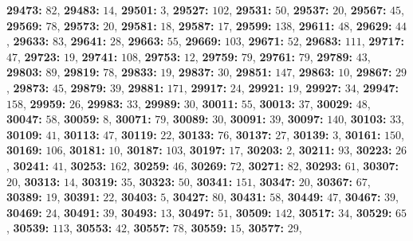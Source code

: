 \textsf{\bfseries 29473:} $82$, \textsf{\bfseries 29483:} $14$, \textsf{\bfseries 29501:} $3$, \textsf{\bfseries 29527:} $102$, \textsf{\bfseries 29531:} $50$, \textsf{\bfseries 29537:} $20$, \textsf{\bfseries 29567:} $45$, \textsf{\bfseries 29569:} $78$, \textsf{\bfseries 29573:} $20$, \textsf{\bfseries 29581:} $18$, \textsf{\bfseries 29587:} $17$, \textsf{\bfseries 29599:} $138$, \textsf{\bfseries 29611:} $48$, \textsf{\bfseries 29629:} $44$, \textsf{\bfseries 29633:} $83$, \textsf{\bfseries 29641:} $28$, \textsf{\bfseries 29663:} $55$, \textsf{\bfseries 29669:} $103$, \textsf{\bfseries 29671:} $52$, \textsf{\bfseries 29683:} $111$, \textsf{\bfseries 29717:} $47$, \textsf{\bfseries 29723:} $19$, \textsf{\bfseries 29741:} $108$, \textsf{\bfseries 29753:} $12$, \textsf{\bfseries 29759:} $79$, \textsf{\bfseries 29761:} $79$, \textsf{\bfseries 29789:} $43$, \textsf{\bfseries 29803:} $89$, \textsf{\bfseries 29819:} $78$, \textsf{\bfseries 29833:} $19$, \textsf{\bfseries 29837:} $30$, \textsf{\bfseries 29851:} $147$, \textsf{\bfseries 29863:} $10$, \textsf{\bfseries 29867:} $29$, \textsf{\bfseries 29873:} $45$, \textsf{\bfseries 29879:} $39$, \textsf{\bfseries 29881:} $171$, \textsf{\bfseries 29917:} $24$, \textsf{\bfseries 29921:} $19$, \textsf{\bfseries 29927:} $34$, \textsf{\bfseries 29947:} $158$, \textsf{\bfseries 29959:} $26$, \textsf{\bfseries 29983:} $33$, \textsf{\bfseries 29989:} $30$, \textsf{\bfseries 30011:} $55$, \textsf{\bfseries 30013:} $37$, \textsf{\bfseries 30029:} $48$, \textsf{\bfseries 30047:} $58$, \textsf{\bfseries 30059:} $8$, \textsf{\bfseries 30071:} $79$, \textsf{\bfseries 30089:} $30$, \textsf{\bfseries 30091:} $39$, \textsf{\bfseries 30097:} $140$, \textsf{\bfseries 30103:} $33$, \textsf{\bfseries 30109:} $41$, \textsf{\bfseries 30113:} $47$, \textsf{\bfseries 30119:} $22$, \textsf{\bfseries 30133:} $76$, \textsf{\bfseries 30137:} $27$, \textsf{\bfseries 30139:} $3$, \textsf{\bfseries 30161:} $150$, \textsf{\bfseries 30169:} $106$, \textsf{\bfseries 30181:} $10$, \textsf{\bfseries 30187:} $103$, \textsf{\bfseries 30197:} $17$, \textsf{\bfseries 30203:} $2$, \textsf{\bfseries 30211:} $93$, \textsf{\bfseries 30223:} $26$, \textsf{\bfseries 30241:} $41$, \textsf{\bfseries 30253:} $162$, \textsf{\bfseries 30259:} $46$, \textsf{\bfseries 30269:} $72$, \textsf{\bfseries 30271:} $82$, \textsf{\bfseries 30293:} $61$, \textsf{\bfseries 30307:} $20$, \textsf{\bfseries 30313:} $14$, \textsf{\bfseries 30319:} $35$, \textsf{\bfseries 30323:} $50$, \textsf{\bfseries 30341:} $151$, \textsf{\bfseries 30347:} $20$, \textsf{\bfseries 30367:} $67$, \textsf{\bfseries 30389:} $19$, \textsf{\bfseries 30391:} $22$, \textsf{\bfseries 30403:} $5$, \textsf{\bfseries 30427:} $80$, \textsf{\bfseries 30431:} $58$, \textsf{\bfseries 30449:} $47$, \textsf{\bfseries 30467:} $39$, \textsf{\bfseries 30469:} $24$, \textsf{\bfseries 30491:} $39$, \textsf{\bfseries 30493:} $13$, \textsf{\bfseries 30497:} $51$, \textsf{\bfseries 30509:} $142$, \textsf{\bfseries 30517:} $34$, \textsf{\bfseries 30529:} $65$, \textsf{\bfseries 30539:} $113$, \textsf{\bfseries 30553:} $42$, \textsf{\bfseries 30557:} $78$, \textsf{\bfseries 30559:} $15$, \textsf{\bfseries 30577:} $29$, 
